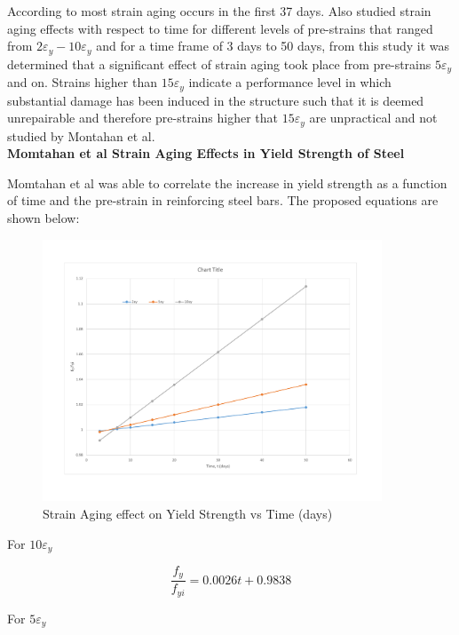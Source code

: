 According to \cite{Restrepo-Posada1994} most strain aging occurs in the first 37 days. Also \cite{Momtahan2009} studied strain aging effects with respect to time for different levels of pre-strains that ranged from $2\varepsilon_y - 10\varepsilon_y$ and for a time frame of 3 days to 50 days, from this study it was determined that a significant effect of strain aging took place from pre-strains $5\varepsilon_y$ and on. Strains higher than $15\varepsilon_y$ indicate a performance level in which substantial damage has been induced in the structure such that it is deemed unrepairable and therefore pre-strains higher that $15\varepsilon_y$ are unpractical and not studied by Montahan et al\cite{Momtahan2009}.
\\
\textbf{Momtahan et al Strain Aging Effects in Yield Strength of Steel}

Momtahan et al was able to correlate the increase in yield strength as a function of time and the pre-strain in reinforcing steel bars. The proposed equations are shown below:

\begin{figure}[htbp]
\centering
\includegraphics[width=0.9\textwidth]{Chapter-4/figs/StrainAging_TimeDependent}
\caption{Strain Aging effect on Yield Strength vs Time (days)}
\label{fig:hist4}
\end{figure}


For $10\varepsilon_y$

\begin{equation}
  \frac{f_y}{f_{yi}}=0.0026t+0.9838
  \label{eq.twelve}
\end{equation} 

For $5\varepsilon_y$

